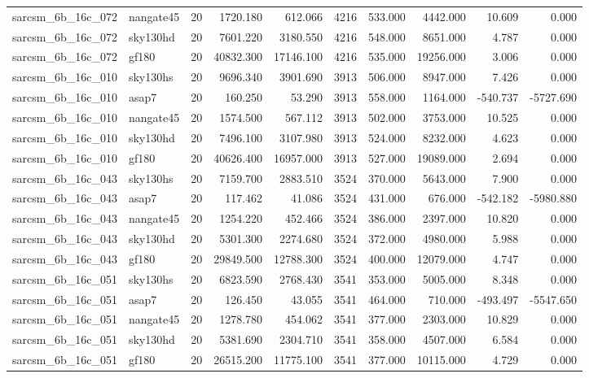 \begin{longtable}{llrrrrrrrr}
sarcsm\_6b\_16c\_072 & nangate45 & 20 & 1720.180 & 612.066 & 4216 & 533.000 & 4442.000 & 10.609 & 0.000 \\
sarcsm\_6b\_16c\_072 & sky130hd & 20 & 7601.220 & 3180.550 & 4216 & 548.000 & 8651.000 & 4.787 & 0.000 \\
sarcsm\_6b\_16c\_072 & gf180 & 20 & 40832.300 & 17146.100 & 4216 & 535.000 & 19256.000 & 3.006 & 0.000 \\
sarcsm\_6b\_16c\_010 & sky130hs & 20 & 9696.340 & 3901.690 & 3913 & 506.000 & 8947.000 & 7.426 & 0.000 \\
sarcsm\_6b\_16c\_010 & asap7 & 20 & 160.250 & 53.290 & 3913 & 558.000 & 1164.000 & -540.737 & -5727.690 \\
sarcsm\_6b\_16c\_010 & nangate45 & 20 & 1574.500 & 567.112 & 3913 & 502.000 & 3753.000 & 10.525 & 0.000 \\
sarcsm\_6b\_16c\_010 & sky130hd & 20 & 7496.100 & 3107.980 & 3913 & 524.000 & 8232.000 & 4.623 & 0.000 \\
sarcsm\_6b\_16c\_010 & gf180 & 20 & 40626.400 & 16957.000 & 3913 & 527.000 & 19089.000 & 2.694 & 0.000 \\
sarcsm\_6b\_16c\_043 & sky130hs & 20 & 7159.700 & 2883.510 & 3524 & 370.000 & 5643.000 & 7.900 & 0.000 \\
sarcsm\_6b\_16c\_043 & asap7 & 20 & 117.462 & 41.086 & 3524 & 431.000 & 676.000 & -542.182 & -5980.880 \\
sarcsm\_6b\_16c\_043 & nangate45 & 20 & 1254.220 & 452.466 & 3524 & 386.000 & 2397.000 & 10.820 & 0.000 \\
sarcsm\_6b\_16c\_043 & sky130hd & 20 & 5301.300 & 2274.680 & 3524 & 372.000 & 4980.000 & 5.988 & 0.000 \\
sarcsm\_6b\_16c\_043 & gf180 & 20 & 29849.500 & 12788.300 & 3524 & 400.000 & 12079.000 & 4.747 & 0.000 \\
sarcsm\_6b\_16c\_051 & sky130hs & 20 & 6823.590 & 2768.430 & 3541 & 353.000 & 5005.000 & 8.348 & 0.000 \\
sarcsm\_6b\_16c\_051 & asap7 & 20 & 126.450 & 43.055 & 3541 & 464.000 & 710.000 & -493.497 & -5547.650 \\
sarcsm\_6b\_16c\_051 & nangate45 & 20 & 1278.780 & 454.062 & 3541 & 377.000 & 2303.000 & 10.829 & 0.000 \\
sarcsm\_6b\_16c\_051 & sky130hd & 20 & 5381.690 & 2304.710 & 3541 & 358.000 & 4507.000 & 6.584 & 0.000 \\
sarcsm\_6b\_16c\_051 & gf180 & 20 & 26515.200 & 11775.100 & 3541 & 377.000 & 10115.000 & 4.729 & 0.000 \\

\end{longtable}
